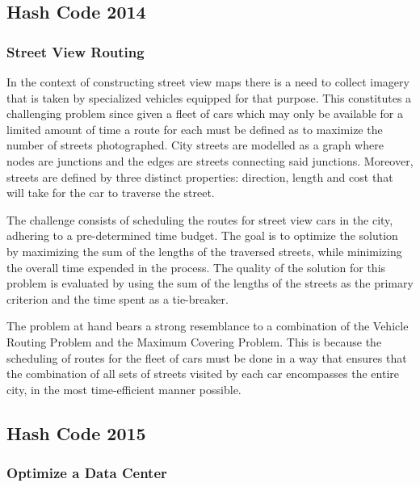 \subsection{Hash Code 2014}
\label{subsec:hashcode-2014}

\subsubsection*{Street View Routing}
\label{subsubsec:hashcode-2014-final}

In the context of constructing street view maps there is a need to collect
imagery that is taken by specialized vehicles equipped for that purpose. This
constitutes a challenging problem since given a fleet of cars which may only be
available for a limited amount of time a route for each must be defined as to
maximize the number of streets photographed. City streets are modelled as a
graph where nodes are junctions and the edges are streets connecting said
junctions. Moreover, streets are defined by three distinct properties:
direction, length and cost that will take for the car to traverse the street.

The challenge consists of scheduling the routes for street view cars in the
city, adhering to a pre-determined time budget. The goal is to optimize the
solution by maximizing the sum of the lengths of the traversed streets, while
minimizing the overall time expended in the process. The quality of the solution
for this problem is evaluated by using the sum of the lengths of the streets as
the primary criterion and the time spent as a tie-breaker.

The problem at hand bears a strong resemblance to a combination of the Vehicle
Routing Problem and the Maximum Covering Problem. This is because the scheduling
of routes for the fleet of cars must be done in a way that ensures that the
combination of all sets of streets visited by each car encompasses the entire
city, in the most time-efficient manner possible.

\subsection{Hash Code 2015}
\label{subsec:hashcode-2015}

\subsubsection*{Optimize a Data Center}
\label{subsubsec:hashcode-2015-qualification}

